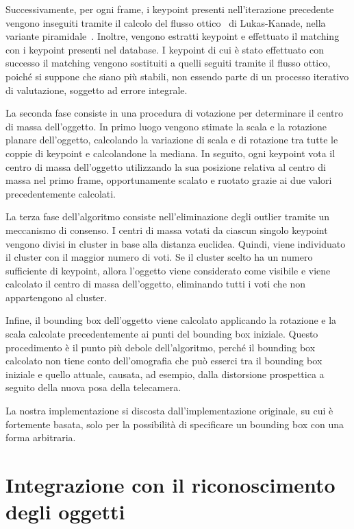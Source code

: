 Successivamente, per ogni frame, i keypoint presenti nell'iterazione precedente vengono inseguiti tramite il calcolo del flusso ottico~\cite{Lucas:1981:IIR:1623264.1623280} di Lukas-Kanade, nella variante piramidale~\cite{Bouguet00pyramidalimplementation}. Inoltre, vengono estratti keypoint e effettuato il matching con i keypoint presenti nel database. I keypoint di cui è stato effettuato con successo il matching vengono sostituiti a quelli seguiti tramite il flusso ottico, poiché si suppone che siano più stabili, non essendo parte di un processo iterativo di valutazione, soggetto ad errore integrale.

La seconda fase consiste in una procedura di votazione per determinare il centro di massa dell'oggetto.
In primo luogo vengono stimate la scala e la rotazione planare dell'oggetto, calcolando la variazione di scala e di rotazione tra tutte le coppie di keypoint e calcolandone la mediana. In seguito, ogni keypoint vota il centro di massa dell'oggetto utilizzando la sua posizione relativa al centro di massa nel primo frame, opportunamente scalato e ruotato grazie ai due valori precedentemente calcolati.

La terza fase dell'algoritmo consiste nell'eliminazione degli outlier tramite un meccanismo di consenso. I centri di massa votati da ciascun singolo keypoint vengono divisi in cluster in base alla distanza euclidea. Quindi, viene individuato il cluster con il maggior numero di voti. Se il cluster scelto ha un numero sufficiente di keypoint, allora l'oggetto viene considerato come visibile e viene calcolato il centro di massa dell'oggetto, eliminando tutti i voti che non appartengono al cluster.

Infine, il bounding box dell'oggetto viene calcolato applicando la rotazione e la scala calcolate precedentemente ai punti del bounding box iniziale. Questo procedimento è il punto più debole dell'algoritmo, perché il bounding box calcolato non tiene conto dell'omografia che può esserci tra il bounding box iniziale e quello attuale, causata, ad esempio, dalla distorsione prospettica a seguito della nuova posa della telecamera.

La nostra implementazione si discosta dall'implementazione originale, su cui è fortemente basata, solo per la possibilità di specificare un bounding box con una forma arbitraria.

\section{Integrazione con il riconoscimento degli oggetti}

